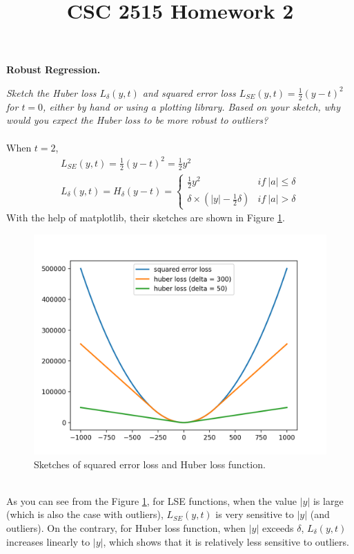\documentclass{myhw}
\title{CSC 2515 Homework 2}
\begin{document}
\begin{homeworkProblem}
\textbf{Robust Regression.}
\begin{homeworkSection}
\emph{Sketch the Huber loss $L_\delta(y,t)$ and squared error loss $L_{SE}(y,t) = \frac{1}{2}(y - t)^2$ for $t = 0$, either by hand or using a plotting library. Based on your sketch, why would you expect the Huber loss to be more robust to outliers? }\\
\\
When $t=2$, 
\begin{gather*}
L_{SE}(y,t) = \frac{1}{2}(y - t)^2 = \frac{1}{2}y^2 \\
L_\delta(y,t) = H_\delta(y-t) = \left\{ 
	\begin{array}{lr} 
	\frac{1}{2}y^2 & if\ |a| \le \delta \\ 
	\delta \times (|y|-\frac{1}{2}\delta) & if\ |a| > \delta
	\end{array} \right.
\end{gather*}
With the help of matplotlib, their sketches are shown in Figure \ref{fig:q1.1}. 
\begin{figure}[h]
  \centering
  \includegraphics[width=.7\textwidth]{q1.png} 
  \caption{Sketches of squared error loss and Huber loss function. }
  \label{fig:q1.1}
\end{figure}
\\
As you can see from the Figure \ref{fig:q1.1}, for LSE functions, when the value $|y|$ is large (which is also the case with outliers), $L_{SE}(y,t)$ is very sensitive to $|y|$ (and outliers). 
On the contrary, for Huber loss function, when $|y|$ exceeds $\delta$, $L_\delta(y, t)$ increases linearly to $|y|$, which shows that it is relatively less sensitive to outliers.
\end{homeworkSection}
\begin{homeworkSection}

\end{homeworkSection}
\end{homeworkProblem}
\end{document}
